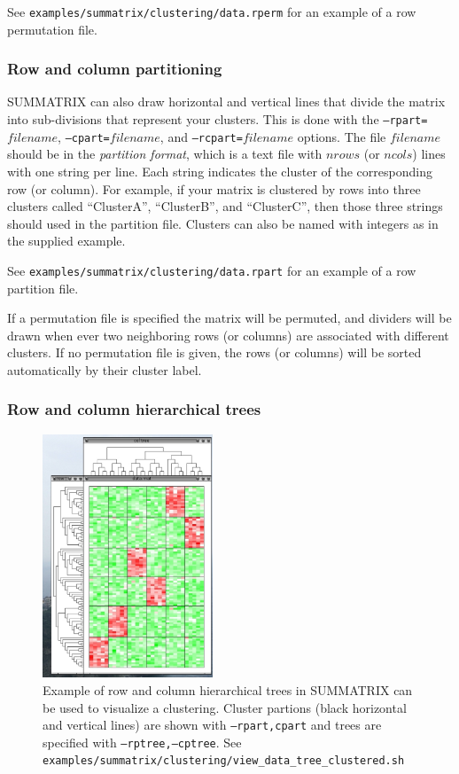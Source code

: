 \documentclass[12pt]{article}
\newcommand{\code}[1]{{\tt #1}}
\begin{document}
See \code{examples/summatrix/clustering/data.rperm} for an example of a
row permutation file.

\subsubsection{Row and column partitioning}

SUMMATRIX can also draw horizontal and vertical lines that divide the matrix
into sub-divisions that represent your clusters.  This is done with the 
\code{--rpart=$filename$}, \code{--cpart=$filename$}, and
\code{--rcpart=$filename$} options.  The file $filename$ should be in the 
{\em partition format}, which is a text file with $nrows$ (or $ncols$) lines
with one string per line.  Each string indicates the cluster of the
corresponding row (or column).  For example, if your matrix is clustered by
rows into three clusters called ``ClusterA'', ``ClusterB'', and ``ClusterC'',
then those three strings should used in the partition file.  Clusters can also
be named with integers as in the supplied example.

See \code{examples/summatrix/clustering/data.rpart} for an example of a
row partition file.

If a permutation file is specified the matrix will be permuted, and dividers
will be drawn when ever two neighboring rows (or columns) are associated with
different clusters.  If no permutation file is given, the rows (or columns) will
be sorted automatically by their cluster label.

\subsubsection{Row and column hierarchical trees}

\begin{figure}
\begin{center}
\includegraphics[width=2in]{figures/summatrix-trees.pdf}
\end{center}
\caption{Example of row and column hierarchical trees in SUMMATRIX can 
be used to visualize a clustering.  Cluster partions (black horizontal and
vertical lines) are shown with \code{--rpart,cpart} and trees are specified with
\code{--rptree,--cptree}. 
See  \code{examples/summatrix/clustering/view\_data\_tree\_clustered.sh}}
\label{fig:summatrix_trees}
\end{figure}
\end{document}
